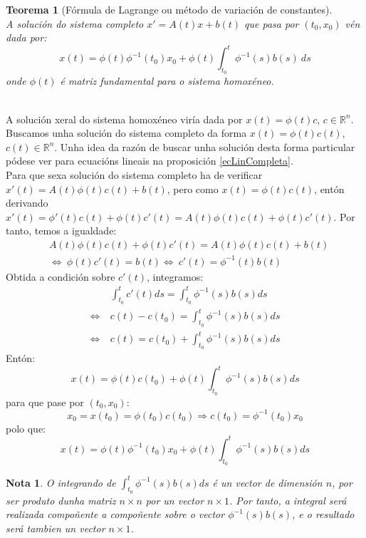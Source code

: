 \documentclass[11pt, a4paper,twoside]{article}
\makeatletter
\theoremstyle{theorem-style}  %
\newtheorem{theorem}{Teorema}[section]  %
\renewenvironment{proof}[1][\proofname]{\par
	\pushQED{\qed}%
	\normalfont \topsep6\p@\@plus6\p@\relax
	\list{}{%
		\settowidth{\leftmargin}{\quad:\hskip\labelsep}%
		\setlength{\labelwidth}{0pt}%
		\setlength{\itemindent}{-\leftmargin}%
	}%
	\item[\hskip\labelsep\itshape#1\@addpunct{:}]\ignorespaces
}{%
	\popQED\endlist\@endpefalse
}
\theoremstyle{definition-style}
\newtheorem*{note}{Nota} %
\theoremstyle{example-style}
\makeatother
\begin{document}
\begin{theorem}[Fórmula de Lagrange ou método de variación de constantes]\label{lagrange-formula}\ \\
	A solución do sistema completo $x' = A(t)x + b(t)$ que pasa por $(t_0, x_0)$ vén dada por:
	\[x(t) = \phi(t) \phi^{-1}(t_0) x_0 + \phi(t)\int_{t_0}^{t} \phi^{-1}(s) b(s) \ ds\]
	onde $\phi(t)$ é matriz fundamental para o sistema homoxéneo.
\end{theorem}
\begin{proof}\ \\
	A solución xeral do sistema homoxéneo viría dada por $x(t) = \phi (t) c$, $c \in \mathbb{R}^n$. Buscamos unha solución do sistema completo da forma $x(t) = \phi (t) c(t)$, $c(t) \in \mathbb{R}^n$. Unha idea da razón de buscar unha solución desta forma particular pódese ver para ecuacións lineais na proposición \ref{ecLinCompleta}.\\
	Para que sexa solución do sistema completo ha de verificar $ x'(t)=A(t)\phi(t)c(t)+b(t) $, pero como $ x(t)=  \phi (t) c(t) $, entón derivando $ x'(t)= \phi'(t)c(t) + \phi(t)c'(t)=A(t)\phi(t)c(t) + \phi(t)c'(t)$. Por tanto, temos a igualdade:
	\begin{align*}
		&A(t)\phi(t)c(t) + \phi(t)c'(t)= A(t)\phi(t)c(t) + b(t) \\
		&\Leftrightarrow \ \phi(t)c'(t) = b(t) \Leftrightarrow \ c'(t) = \phi^{-1}(t) b(t)
	\end{align*}
	Obtida a condición sobre $ c'(t) $, integramos:
	\begin{align*}
	& \int_{t_0}^{t} c'(t) ds = \int_{t_0}^{t} \phi^{-1}(s) b(s) ds\\
	\Leftrightarrow \ &c(t) - c(t_0) = \int_{t_0}^{t} \phi^{-1}(s) b(s) ds\\
	\Leftrightarrow \ &c(t) = c(t_0) + \int_{t_0}^{t} \phi^{-1}(s) b(s) ds
	\end{align*}
	Entón:
	\[x(t) = \phi(t) c(t_0) + \phi(t) \int_{t_0}^{t} \phi^{-1}(s) b(s) ds\]
	para que pase por $(t_0, x_0)$:
	\[x_0 = x(t_0) = \phi (t_0) c(t_0) \Rightarrow c(t_0) = \phi^{-1}(t_0) x_0 \] 
	polo que:
	\[x(t) = \phi(t) \phi^{-1}(t_0) x_0 + \phi(t) \int_{t_0}^{t} \phi^{-1}(s) b(s) ds\]
\end{proof}
\begin{note}
	O integrando de $ \int_{t_0}^{t} \phi^{-1}(s) b(s) ds $ é un vector de dimensión $ n $, por ser produto dunha matriz $ n\times n $ por un vector  $ n\times 1 $. Por tanto, a integral será realizada compoñente a compoñente sobre o vector $ \phi^{-1}(s) b(s) $, e o resultado será tambien un vector $ n\times 1 $.
\end{note}
\end{document}
